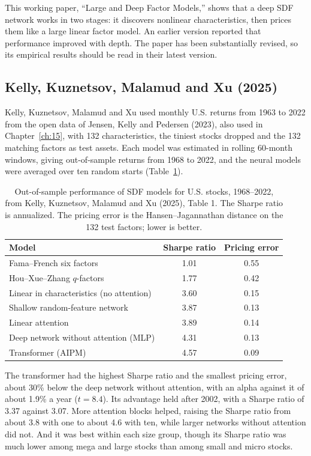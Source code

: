 This working paper, ``Large and Deep Factor Models,'' shows that a deep SDF network works in two stages: it discovers nonlinear characteristics, then prices them like a large linear factor model. An earlier version reported that performance improved with depth. The paper has been substantially revised, so its empirical results should be read in their latest version.

\subsection{Kelly, Kuznetsov, Malamud and Xu (2025)}

Kelly, Kuznetsov, Malamud and Xu used monthly U.S. returns from 1963 to 2022 from the open data of Jensen, Kelly and Pedersen (2023), also used in Chapter~\ref{ch:15}, with 132 characteristics, the tiniest stocks dropped and the 132 matching factors as test assets. Each model was estimated in rolling 60-month windows, giving out-of-sample returns from 1968 to 2022, and the neural models were averaged over ten random starts (Table~\ref{tab:22-aipm}).

\begin{table}[htbp]
\centering
\small
\caption{Out-of-sample performance of SDF models for U.S. stocks, 1968--2022, from Kelly, Kuznetsov, Malamud and Xu (2025), Table 1. The Sharpe ratio is annualized. The pricing error is the Hansen--Jagannathan distance on the 132 test factors; lower is better.}
\label{tab:22-aipm}
\begin{tabular}{@{}lcc@{}}
\toprule
Model & Sharpe ratio & Pricing error \\
\midrule
Fama--French six factors & 1.01 & 0.55 \\
Hou--Xue--Zhang $q$-factors & 1.77 & 0.42 \\
Linear in characteristics (no attention) & 3.60 & 0.15 \\
Shallow random-feature network & 3.87 & 0.13 \\
Linear attention & 3.89 & 0.14 \\
Deep network without attention (MLP) & 4.31 & 0.13 \\
Transformer (AIPM) & 4.57 & 0.09 \\
\bottomrule
\end{tabular}
\end{table}

The transformer had the highest Sharpe ratio and the smallest pricing error, about 30\% below the deep network without attention, with an alpha against it of about 1.9\% a year ($t = 8.4$). Its advantage held after 2002, with a Sharpe ratio of 3.37 against 3.07. More attention blocks helped, raising the Sharpe ratio from about 3.8 with one to about 4.6 with ten, while larger networks without attention did not. And it was best within each size group, though its Sharpe ratio was much lower among mega and large stocks than among small and micro stocks.

